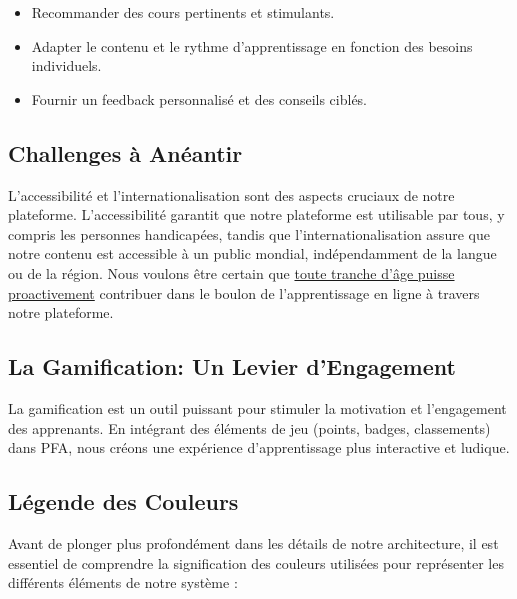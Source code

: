 \begin{itemize}
    \item Recommander des cours pertinents et stimulants. 
    \item Adapter le contenu et le rythme d'apprentissage en fonction des besoins individuels. 
    \item Fournir un feedback personnalisé et des conseils ciblés.
\end{itemize}

\subsection{ Challenges à Anéantir}

L'accessibilité et l'internationalisation sont des aspects cruciaux de notre plateforme. L'accessibilité garantit que notre plateforme est utilisable par tous, y compris les personnes handicapées, tandis que l'internationalisation assure que notre contenu est accessible à un public mondial, indépendamment de la langue ou de la région.
\smallbreak Nous voulons être certain que  \underline {toute tranche d'âge puisse proactivement} contribuer dans le boulon de l'apprentissage en ligne à travers notre plateforme.

\subsection{La Gamification: Un Levier d'Engagement}

La \gls{gamification} est un outil puissant pour stimuler la motivation et l'engagement des apprenants. En intégrant des éléments de jeu (points, badges, classements) dans PFA, nous créons une expérience d'apprentissage plus interactive et ludique.
\newpage

\subsection{Légende des Couleurs}

Avant de plonger plus profondément dans les détails de notre architecture, il est essentiel de comprendre la signification des couleurs utilisées pour représenter les différents éléments de notre système :

